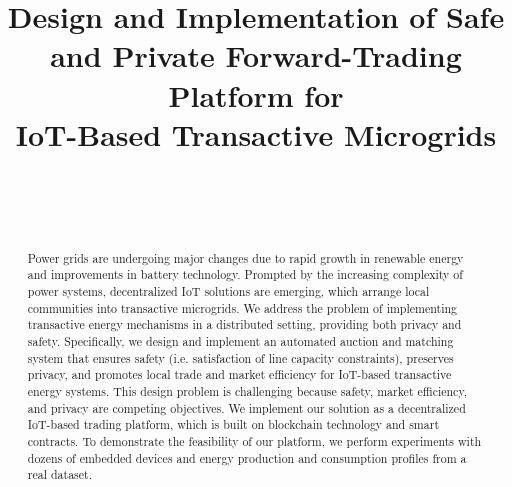 \documentclass[conference,10pt,letterpaper]{IEEEtran}
\begin{document}
\setlength{\marginparwidth}{1.5cm} %

\title{Design and Implementation of Safe and Private Forward-Trading Platform for\\ IoT-Based Transactive Microgrids}

\author{
\\
\and
{}
\and
{}
\and
{}
\and
{}
\\
}
\renewcommand{\lstlistingname}{log}



\maketitle

\thispagestyle{plain}
\pagestyle{plain}

\begin{abstract}
Power grids are undergoing major changes due to rapid growth in renewable energy and improvements in battery technology. Prompted by the increasing complexity of power systems, decentralized IoT solutions are emerging, which arrange local communities into transactive microgrids.
We address the problem of implementing transactive energy mechanisms in a distributed setting, providing both privacy and safety.  Specifically, we design and implement an automated auction and matching system that ensures safety (i.e. satisfaction of line capacity constraints), preserves privacy, and promotes local trade and market efficiency for IoT-based transactive energy systems. This design problem is challenging because safety, market efficiency, and privacy are competing objectives.
We implement our solution as a decentralized IoT-based trading platform, which is built on blockchain technology and smart contracts.
To demonstrate the feasibility of our platform, we perform experiments with dozens of embedded devices and energy production and consumption profiles from a real dataset.
\end{abstract}
\end{document}
